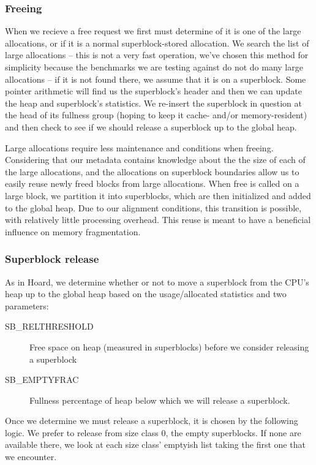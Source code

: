 \documentclass{article}
\begin{document}
\subsubsection{Freeing}
When we recieve a free request we first must determine of it is one of the
large allocations, or if it is a normal superblock-stored allocation. We
search the list of large allocations -- this is not a very fast operation,
we've chosen this method for simplicity because the benchmarks we are testing
against do not do many large allocations -- if it is not found there, we
assume that it is on a superblock. Some pointer arithmetic will find us the 
superblock's header and then we can update the heap and superblock's
statistics. We re-insert the superblock in question at the head of its
fullness group (hoping to keep it cache- and/or memory-resident) and then
check to see if we should release a superblock up to the global heap.

Large allocations require less maintenance and conditions when freeing.
Considering that our metadata contains knowledge about the the size of each 
of the large allocations, and the allocations on superblock boundaries 
allow us to easily reuse newly freed blocks from large allocations. When free 
is called on a large block, we partition it into superblocks, which are then 
initialized and added to the global heap. Due to our alignment conditions, 
this transition is possible, with relatively little processing overhead.
This reuse is meant to have a beneficial influence on memory fragmentation.

\subsubsection{Superblock release}
As in Hoard, we determine whether or not to move a superblock from the CPU's
heap up to the global heap based on the usage/allocated statistics and
two parameters: 
\begin{description}
    \item[SB\_RELTHRESHOLD] Free space on heap (measured in superblocks)
        before we consider releasing a superblock
    \item[SB\_EMPTYFRAC] Fullness percentage of heap below which we will
        release a superblock.
\end{description}

Once we determine we must release a superblock, it is chosen by the following
logic. We prefer to release from size class 0, the empty superblocks. If none
are available there, we look at each size class' emptyish list taking the
first one that we encounter.
\end{document}
